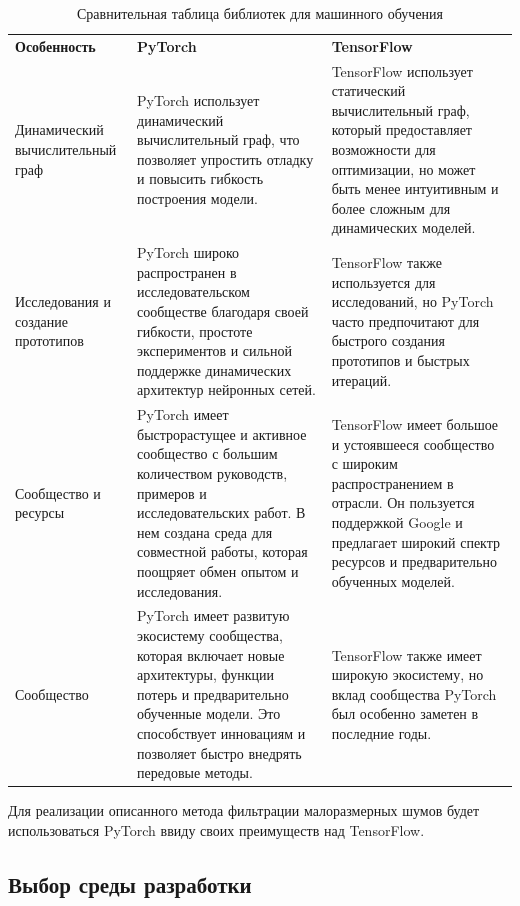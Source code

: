 \begin{table}[h!]
	\centering
    \captionsetup{justification=raggedleft,singlelinecheck=false}
	\caption{\label{tabular:deeplearing_frameworks} Сравнительная таблица библиотек для машинного обучения}
	\begin{tabular}{|p{4 cm}|p{5.5 cm}|p{5.5 cm}|}
		\cline{1-3}
		\textbf{Особенность}  & \textbf{PyTorch} & \textbf{TensorFlow} \\ \cline{1-3}
        Динамический вычислительный граф & PyTorch использует динамический вычислительный граф, что позволяет упростить отладку и повысить гибкость построения модели. & TensorFlow использует статический вычислительный граф, который предоставляет возможности для оптимизации, но может быть менее интуитивным и более сложным для динамических моделей. \\ \cline{1-3}
        Исследования и создание прототипов & PyTorch широко распространен в исследовательском сообществе благодаря своей гибкости, простоте экспериментов и сильной поддержке динамических архитектур нейронных сетей.	& TensorFlow также используется для исследований, но PyTorch часто предпочитают для быстрого создания прототипов и быстрых итераций.\\ \cline{1-3}
        Сообщество и ресурсы & PyTorch имеет быстрорастущее и активное сообщество с большим количеством руководств, примеров и исследовательских работ. В нем создана среда для совместной работы, которая поощряет обмен опытом и исследования. & TensorFlow имеет большое и устоявшееся сообщество с широким распространением в отрасли. Он пользуется поддержкой Google и предлагает широкий спектр ресурсов и предварительно обученных моделей. \\ \cline{1-3}
        Сообщество & PyTorch имеет развитую экосистему сообщества, которая включает новые архитектуры, функции потерь и предварительно обученные модели. Это способствует инновациям и позволяет быстро внедрять передовые методы. &	TensorFlow также имеет широкую экосистему, но вклад сообщества PyTorch был особенно заметен в последние годы. \\ \cline{1-3}
	\end{tabular}%
\end{table}

Для реализации описанного метода фильтрации малоразмерных шумов будет использоваться PyTorch ввиду своих преимуществ над TensorFlow.

\subsection{Выбор среды разработки}

